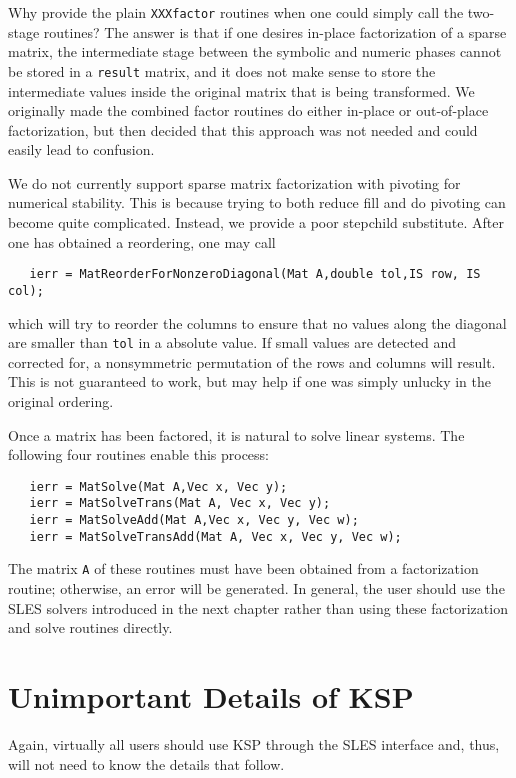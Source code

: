 Why provide the plain {\tt XXXfactor} routines when one could simply 
call the two-stage routines? The answer is that if one desires in-place 
factorization of a sparse matrix, the intermediate stage between the 
symbolic and numeric phases cannot be stored in a {\tt result} matrix, and
it does not make sense to store the intermediate values
inside the original matrix 
that is being transformed.  We originally made the combined factor routines
do either in-place or out-of-place factorization, but then decided that 
this approach was not needed and could easily lead to confusion.

We do not currently support sparse matrix factorization with pivoting
for numerical stability. This is because trying to both reduce fill
and do pivoting can become quite complicated. Instead, we provide a 
poor stepchild substitute. After one has obtained a reordering, one
may call
\begin{verbatim}
   ierr = MatReorderForNonzeroDiagonal(Mat A,double tol,IS row, IS col);
\end{verbatim}
which will try to reorder the columns to ensure that no values along 
the diagonal are smaller than {\tt tol} in a absolute value. If small 
values are detected and corrected for, a nonsymmetric
permutation of the rows and columns will result. This is not guaranteed to work, 
but may help if one was simply unlucky in the original ordering.

Once a matrix has been factored, it is natural to solve linear systems.
The following four routines enable this process:  
\begin{verbatim}
   ierr = MatSolve(Mat A,Vec x, Vec y);
   ierr = MatSolveTrans(Mat A, Vec x, Vec y);
   ierr = MatSolveAdd(Mat A,Vec x, Vec y, Vec w);
   ierr = MatSolveTransAdd(Mat A, Vec x, Vec y, Vec w);
\end{verbatim}
The  
matrix 
{\tt A} of these routines must have been obtained from a 
factorization routine; otherwise, an error will be generated.
In general, the user should use the SLES solvers introduced in the 
next chapter rather than using these factorization and solve routines
directly.

\section{Unimportant Details of KSP}

Again, virtually all users should use KSP through the SLES interface
and, thus, will not need to know the details that follow. 

